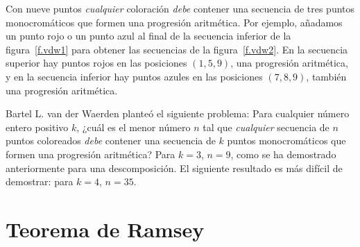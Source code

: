 Con nueve puntos \emph{cualquier} coloración \emph{debe} contener una secuencia de tres puntos monocromáticos que formen una progresión aritmética. Por ejemplo, añadamos un punto rojo o un punto azul al final de la secuencia inferior de la figura~\ref{f.vdw1} para obtener las secuencias de la figura~\ref{f.vdw2}. En la secuencia superior hay puntos rojos en las posiciones $(1,5,9)$, una progresión aritmética, y en la secuencia inferior hay puntos azules en las posiciones $(7,8,9)$, también una progresión aritmética.

Bartel L. van der Waerden planteó el siguiente problema: Para cualquier número entero positivo $k$, ¿cuál es el menor número $n$ tal que \emph{cualquier} secuencia de $n$ puntos coloreados \emph{debe} contener una secuencia de $k$ puntos monocromáticos que formen una progresión aritmética? Para $k=3$, $n=9$, como se ha demostrado anteriormente para una descomposición. El siguiente resultado es más difícil de demostrar: para $k=4$, $n=35$.


\section{Teorema de Ramsey}\label{s.ramsey}

